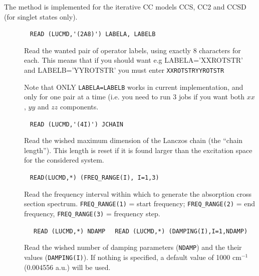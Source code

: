 The method is  implemented for the iterative CC models CCS, CC2 and CCSD (for 
singlet states only).

\begin{description}

\item[] \verb| |\newline
   \verb|READ (LUCMD,'(2A8)') LABELA, LABELB|\newline

Read the wanted pair of operator labels, using exactly 8 characters for each. 
This means that if you should want e.g LABELA='XXROTSTR' and LABELB='YYROTSTR'
you must enter\newline
\verb|XXROTSTRYYROTSTR|

Note that ONLY \verb|LABELA=LABELB| 
works in current implementation, and only for one pair at a time
(i.e. you need to run 3 jobs if you want both $xx$, $yy$ and $zz$ components.

\item[] \verb| |\newline
      \verb|READ (LUCMD,'(4I)') JCHAIN |\newline
      
Read the wished maximum dimension of the Lanczos chain (the ``chain length''). 
This length is reset if it is found larger than the 
excitation space for the considered system.      

\item[] \verb| |\newline
      \verb|READ(LUCMD,*) (FREQ_RANGE(I), I=1,3) |\newline
      
Read the  frequency interval within which to generate the absorption cross section spectrum.
\verb|FREQ_RANGE(1)| = start frequency;  \verb|FREQ_RANGE(2)| = end frequency, 
\verb|FREQ_RANGE(3)| = frequency step.

\item[] \verb| |\newline
      \verb| READ (LUCMD,*) NDAMP |\newline
      \verb| READ (LUCMD,*) (DAMPING(I),I=1,NDAMP) |\newline
      
Read the wished number of damping parameters (\verb|NDAMP|) and 
the their values (\verb|DAMPING(I)|). 
If nothing is specified, a default value of 1000 cm$^{-1}$ (0.004556 a.u.) 
will be used.

\item[] \verb| |\newline


\end{description}
